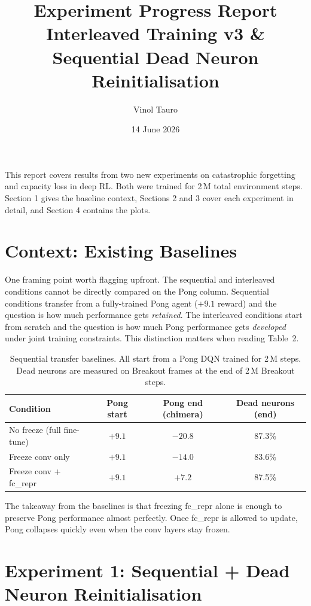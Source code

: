 \documentclass[11pt,a4paper]{article}
\title{\textbf{Experiment Progress Report}\\[0.4em]
       \large Interleaved Training v3 \& Sequential Dead Neuron Reinitialisation}
\author{Vinol Tauro}
\date{14 June 2026}
\begin{document}
\maketitle

\noindent This report covers results from two new experiments on catastrophic forgetting
and capacity loss in deep RL. Both were trained for 2\,M total environment steps.
Section 1 gives the baseline context, Sections 2 and 3 cover each experiment in detail,
and Section 4 contains the plots.

\section{Context: Existing Baselines}

One framing point worth flagging upfront. The sequential and interleaved conditions cannot
be directly compared on the Pong column. Sequential conditions transfer from a fully-trained
Pong agent ($+9.1$ reward) and the question is how much performance gets \emph{retained}.
The interleaved conditions start from scratch and the question is how much Pong performance
gets \emph{developed} under joint training constraints. This distinction matters when
reading Table~2.

\begin{table}[h]
\centering\small
\begin{tabular}{lccc}
\toprule
\textbf{Condition} & \textbf{Pong start} & \textbf{Pong end (chimera)} & \textbf{Dead neurons (end)} \\
\midrule
No freeze (full fine-tune)    & $+9.1$ & $-20.8$ & 87.3\% \\
Freeze conv only              & $+9.1$ & $-14.0$ & 83.6\% \\
Freeze conv + fc\_repr        & $+9.1$ & $+7.2$  & 87.5\% \\
\bottomrule
\end{tabular}
\caption{Sequential transfer baselines. All start from a Pong DQN trained for 2\,M steps.
Dead neurons are measured on Breakout frames at the end of 2\,M Breakout steps.}
\end{table}

The takeaway from the baselines is that freezing fc\_repr alone is enough to preserve Pong
performance almost perfectly. Once fc\_repr is allowed to update, Pong collapses quickly
even when the conv layers stay frozen.

\section{Experiment 1: Sequential + Dead Neuron Reinitialisation}
\end{document}
